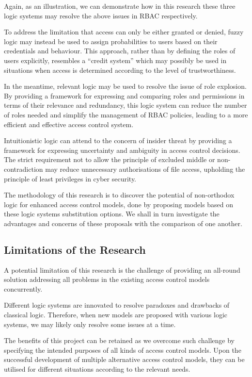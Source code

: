 \documentclass{article}
\begin{document}
Again, as an illustration, we can demonstrate how in this research these three logic systems may resolve the above issues in RBAC respectively.

To address the limitation that access can only be either granted or denied, fuzzy logic may instead be used to assign probabilities to users based on their credentials and behaviour. This approach, rather than by defining the roles of users explicitly, resembles a ``credit system'' which may possibly be used in situations when access is determined according to the level of trustworthiness.

In the meantime, relevant logic may be used to resolve the issue of role explosion.\cite{role-explosion} By providing a framework for expressing and comparing roles and permissions in terms of their relevance and redundancy, this logic system can reduce the number of roles needed and simplify the management of RBAC policies, leading to a more efficient and effective access control system.

Intuitionistic logic can attend to the concern of insider threat by providing a framework for expressing uncertainty and ambiguity in access control decisions. The strict requirement not to allow the principle of excluded middle or non-contradiction may reduce unnecessary authorisations of file access, upholding the principle of least privileges in cyber security.

The methodology of this research is to discover the potential of non-orthodox logic for enhanced access control models, done by proposing models based on these logic systems substitution options. We shall in turn investigate the advantages and concerns of these proposals with the comparison of one another.

\subsection*{Limitations of the Research}

A potential limitation of this research is the challenge of providing an all-round solution addressing all problems in the existing access control models concurrently.

Different logic systems are innovated to resolve paradoxes and drawbacks of classical logic. Therefore, when new models are proposed with various logic systems, we may likely only resolve some issues at a time.

The benefits of this project can be retained as we overcome such challenge by specifying the intended purposes of all kinds of access control models. Upon the successful development of multiple alternative access control models, they can be utilised for different situations according to the relevant needs.
\end{document}
